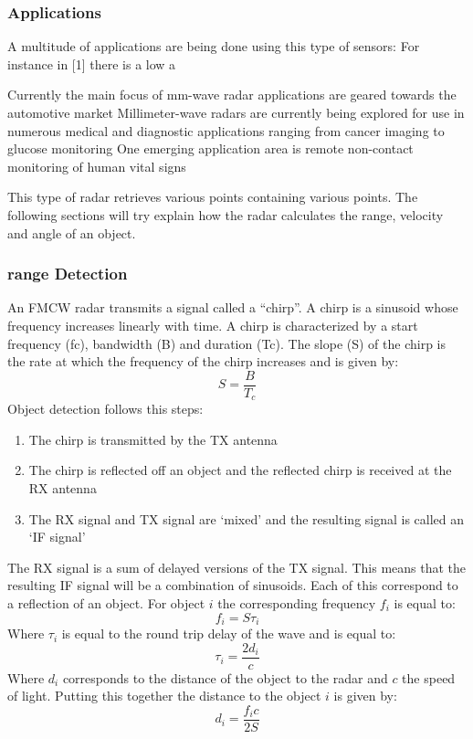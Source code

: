 \subsubsection{Applications}
A multitude of applications are being done using this type of sensors:
For instance in  [1] there is a low a





Currently the main focus of mm-wave radar applications
are geared towards the automotive market
Millimeter-wave radars are currently being explored for use
in numerous medical and diagnostic applications ranging from
cancer imaging to glucose monitoring
One emerging
application area is remote non-contact monitoring of human
vital signs 




This type of radar retrieves various points containing various points. The following sections will try explain how the radar calculates the range, velocity and angle of an object.
\subsubsection*{range Detection}
An \ac{FMCW} radar transmits a signal called a “chirp”. A chirp is a sinusoid whose frequency  increases linearly with time.
A chirp is characterized by a start frequency (fc), bandwidth (B) and duration (Tc). The slope (S) of the chirp is the rate at which the frequency of the chirp increases and is given by:
\begin{equation}
    S=\frac{B}{T_c}
\end{equation}
Object detection follows this steps:
\begin{enumerate}
    \item The chirp is transmitted by the TX antenna
    \item The chirp is reflected off an object and the reflected chirp is received at the RX antenna
    \item The RX signal and TX signal are ‘mixed’ and the resulting signal is called an ‘IF signal’
\end{enumerate}


The RX signal is a sum of delayed versions of the TX signal. This means that the resulting \ac{IF} signal will be a combination of sinusoids. Each of this correspond to a reflection of an object. For object $i$ the corresponding frequency $f_i$ is equal to:
\begin{equation}
    f_i=S\tau_i
\end{equation}
Where $\tau_i$ is equal to the round trip delay of the wave and is equal to:
\begin{equation}
    \tau_i=\frac{2d_i}{c}
\end{equation}
Where $d_i$ corresponds to the distance of the object to the radar and $c$ the speed of light.
Putting this together the distance to the object $i$ is given by:
\begin{equation}
    d_i=\frac{f_ic}{2S}
\end{equation}


